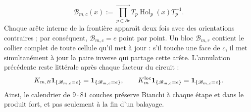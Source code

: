 \begin{equation}\label{eq:pdf2-ym-owner-bianchi-block-product}
 \mathscr B_{m,c}(x):=
 \prod_{p\subset\partial c}^{\longrightarrow}
 T_p\operatorname{Hol}_p(x)T_p^{-1}.
\end{equation}
Chaque arête interne de la frontière apparaît deux fois avec des orientations contraires ;
par conséquent, $\mathscr B_{m,c}=e$ point par point. Un bloc
$\mathcal B_{m,r}$ contient le collier complet de toute cellule qu’il met à jour : s’il touche
une face de $c$, il met simultanément à jour la paire inverse qui partage cette arête.
L’annulation précédente reste littérale après chaque facteur du circuit :
\begin{equation}\label{eq:pdf2-ym-owner-bianchi-block-invariance}
 K_{m,B}\mathbf1_{\{\mathscr B_{m,c}=e\}}
 =\mathbf1_{\{\mathscr B_{m,c}=e\}},
 \qquad
 K_m^{\rm loc}\mathbf1_{\{\mathscr B_{m,c}=e\}}
 =\mathbf1_{\{\mathscr B_{m,c}=e\}}.
\end{equation}
Ainsi, le calendrier de $9\cdot81$ couches préserve Bianchi à chaque étape et dans le produit fort, et pas seulement à la fin d'un balayage.

